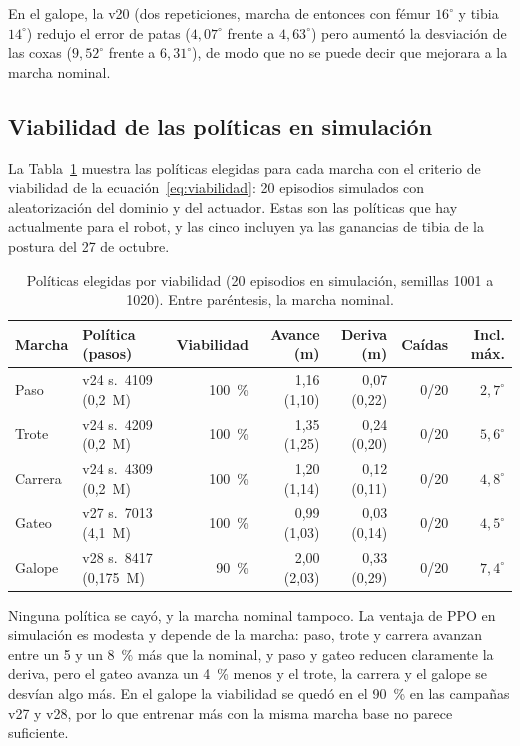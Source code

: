 En el galope, la v20 (dos repeticiones, marcha de entonces con fémur $16^\circ$ y
tibia $14^\circ$) redujo el error de patas ($4{,}07^\circ$ frente a $4{,}63^\circ$)
pero aumentó la desviación de las coxas ($9{,}52^\circ$ frente a $6{,}31^\circ$), de
modo que no se puede decir que mejorara a la marcha nominal.

\subsection{Viabilidad de las políticas en simulación}
\label{sec:viabilidad-resultados}

La Tabla~\ref{tab:viabilidad} muestra las políticas elegidas para cada marcha con el
criterio de viabilidad de la ecuación~\eqref{eq:viabilidad}: 20 episodios simulados
con aleatorización del dominio y del actuador. Estas son las políticas que hay
actualmente para el robot, y las cinco incluyen ya las ganancias de tibia de la
postura del 27 de octubre.

\begin{table}[H]
\centering
\caption{Políticas elegidas por viabilidad (20 episodios en simulación, semillas 1001 a 1020). Entre paréntesis, la marcha nominal.}
\label{tab:viabilidad}
\small
\begin{tabular}{llrrrrr}
\toprule
Marcha & Política (pasos) & Viabilidad & Avance (m) & Deriva (m) & Caídas & Incl. máx. \\
\midrule
Paso & v24 s.\ 4109 (0,2~M) & 100~\% & 1,16 (1,10) & 0,07 (0,22) & 0/20 & $2{,}7^\circ$ \\
Trote & v24 s.\ 4209 (0,2~M) & 100~\% & 1,35 (1,25) & 0,24 (0,20) & 0/20 & $5{,}6^\circ$ \\
Carrera & v24 s.\ 4309 (0,2~M) & 100~\% & 1,20 (1,14) & 0,12 (0,11) & 0/20 & $4{,}8^\circ$ \\
Gateo & v27 s.\ 7013 (4,1~M) & 100~\% & 0,99 (1,03) & 0,03 (0,14) & 0/20 & $4{,}5^\circ$ \\
Galope & v28 s.\ 8417 (0,175~M) & 90~\% & 2,00 (2,03) & 0,33 (0,29) & 0/20 & $7{,}4^\circ$ \\
\bottomrule
\end{tabular}
\end{table}

Ninguna política se cayó, y la marcha nominal tampoco. La ventaja de PPO en
simulación es modesta y depende de la marcha: paso, trote y carrera avanzan entre un
5 y un 8~\% más que la nominal, y paso y gateo reducen claramente la deriva, pero el
gateo avanza un 4~\% menos y el trote, la carrera y el galope se desvían algo más. En
el galope la viabilidad se quedó en el 90~\% en las campañas v27 y v28, por lo que
entrenar más con la misma marcha base no parece suficiente.


